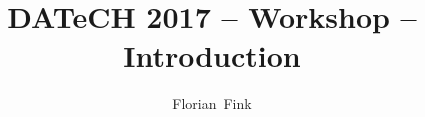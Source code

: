 
\title{DATeCH 2017 -- \pocoto{} Workshop -- Introduction}
\author{Florian~Fink}



\begin{frame}
	\titlepage
\end{frame}


